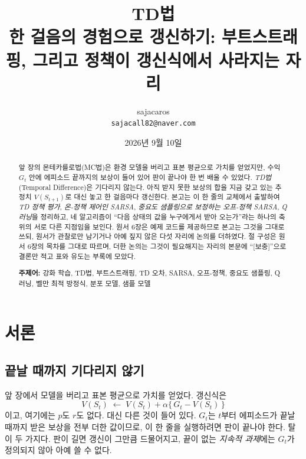 \documentclass[11pt,a4paper]{article}
\title{\bfseries TD법\\[2mm]
\large 한 걸음의 경험으로 갱신하기: 부트스트래핑, 그리고
정책이 갱신식에서 사라지는 자리}
\author{sajacaros\\\small \texttt{sajacall82@naver.com}}
\date{2026년 9월 10일}
\begin{document}
\maketitle

\begin{abstract}
\noindent
앞 장의 몬테카를로법(MC법)은 환경 모델을 버리고 표본 평균으로 가치를 얻었지만, 수익 $G_t$ 안에
에피소드 끝까지의 보상이 들어 있어 판이 끝나야 한 번 배울 수 있었다. \emph{TD법}(Temporal
Difference)은 기다리지 않는다. 아직 받지 못한 보상의 합을 지금 갖고 있는 추정치 $V(S_{t+1})$로
대신 놓고 한 걸음마다 갱신한다.
본고는 이 한 줄의 교체에서 출발하여 \emph{TD 정책 평가}, \emph{온-정책 제어인 SARSA},
\emph{중요도 샘플링으로 보정하는 오프-정책 SARSA}, \emph{Q 러닝}을 정리하고, 네 알고리즘이
``다음 상태의 값을 누구에게서 받아 오는가''라는 하나의 축 위의 서로 다른 지점임을 보인다.
원서\cite{dlfs4} 6장은 예제 코드를 제공하므로 본고는 그것을 그대로 쓰되, 원서가 관찰로만 남기거나
아예 짚지 않은 다섯 자리에 논의를 더하였다. 절 구성은 원서 6장의 목차를 그대로 따르며, 더한 논의는
그것이 필요해지는 자리의 본문에 ``[보충]''으로 결론만 적고 표와 유도는 부록에 모았다.

\vspace{2mm}
\noindent\textbf{주제어:} 강화 학습, TD법, 부트스트래핑, TD 오차, SARSA, 오프-정책, 중요도 샘플링,
Q 러닝, 벨만 최적 방정식, 분포 모델, 샘플 모델
\end{abstract}

\tableofcontents
\vspace{4mm}

\section*{서론}

\subsection*{끝날 때까지 기다리지 않기}

앞 장\cite{ch05}에서 모델을 버리고 표본 평균으로 가치를 얻었다. 갱신식은
\begin{equation*}
  V(S_t) \;\leftarrow\; V(S_t) + \alpha\bigl\{\, G_t - V(S_t) \,\bigr\}
\end{equation*}
이고, 여기에는 $p$도 $r$도 없다. 대신 다른 것이 들어 있다. $G_t$는 $t$부터 에피소드가 끝날 때까지
받은 보상을 전부 더한 값이므로, 이 한 줄을 실행하려면 판이 끝나야 한다. 탈이 두 가지다. 판이 길면
갱신이 그만큼 드물어지고, 끝이 없는 \emph{지속적 과제}에는 $G_t$가 정의되지 않아 아예 쓸 수 없다.
\end{document}

